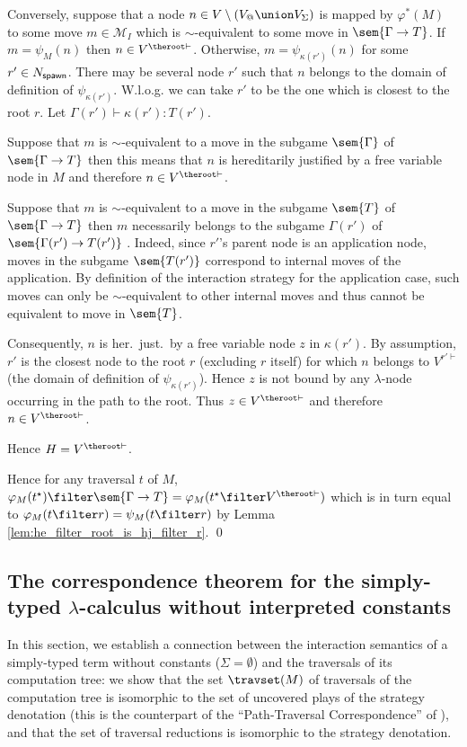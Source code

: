 Conversely, suppose that a node $n \in V\setminus (V_@\union V_\Sigma)$ is mapped by
$\varphi^*(M)$ to some move $m\in \mathcal{M}_I$ which is $\sim$-equivalent
to some move in $\sem{\Gamma \rightarrow T}$.
 If $m = \psi_M(n)$ then $n\in V^{\theroot\vdash}$. Otherwise,
$m = \psi_{\kappa(r')}(n)$ for some $r' \in N_{\sf spawn}$. There
may be several node $r'$ such that $n$ belongs to the domain of
definition of $\psi_{\kappa(r')}$. W.l.o.g. we can take $r'$ to be
the one which is closest to the root $r$. Let $\Gamma(r') \vdash
\kappa(r') : T(r')$.
    \begin{compactitem}
    \item Suppose that $m$ is $\sim$-equivalent to a move in the subgame $\sem{\Gamma}$ of $\sem{\Gamma \rightarrow T}$
    then this means that $n$ is hereditarily justified by a free variable node in $M$ and therefore $n \in V^{\theroot\vdash}$.

    \item Suppose that $m$ is $\sim$-equivalent to a move in the subgame $\sem{T}$ of $\sem{\Gamma \rightarrow T}$
    then $m$ necessarily belongs to the subgame $\Gamma(r')$ of $\sem{\Gamma(r')\rightarrow T(r')}$ .
    Indeed, since $r'$'s parent node is an application node, moves in the subgame
    $\sem{T(r')}$ correspond to internal moves of the application. By definition of
    the interaction strategy for the application case, such moves can only be $\sim$-equivalent to other internal
    moves and thus cannot be equivalent to move in $\sem{T}$.

    Consequently, $n$ is her.\ just.\ by a free variable node $z$ in $\kappa(r')$. By assumption, $r'$ is the closest node to the root $r$ (excluding $r$ itself) for which $n$ belongs to $V^{r'\vdash}$ (the domain of definition of $\psi_{\kappa(r')}$). Hence $z$ is not bound by any $\lambda$-node occurring in the path to the root. Thus $z\in
    V^{\theroot\vdash}$ and therefore $n \in V^{\theroot\vdash}$.
    \end{compactitem}
Hence $H = V^{\theroot\vdash}$.

Hence for any traversal $t$ of $M$, $\varphi_M(t^\star) \filter
\sem{\Gamma \rightarrow T} = \varphi_M(t^\star\filter V^{\theroot\vdash})$
which is in turn equal to $ \varphi_M(t\filter r) = \psi_M(t\filter r)$
by Lemma \ref{lem:he_filter_root_is_hj_filter_r}. \qed


\subsection{The correspondence theorem for the simply-typed $\lambda$-calculus without interpreted constants}
In this section, we establish a connection between the interaction
semantics of a simply-typed term without constants ($\Sigma =
\emptyset$) and the traversals of its computation tree: we show that
the set $\travset(M)$ of traversals of the computation tree is
isomorphic to the set of uncovered plays of the strategy denotation
(this is the counterpart of the ``Path-Traversal Correspondence'' of
\cite{OngLics2006}), and that the set of traversal reductions is
isomorphic to the strategy denotation.


